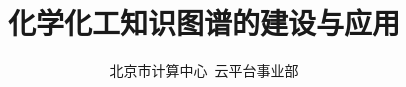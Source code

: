 
\title{化学化工知识图谱的建设与应用}
\author[ ]{北京市计算中心~云平台事业部}   %
\renewcommand*{\Authfont}{\small\rm} %
\renewcommand*{\Affilfont}{\small\it} %
\renewcommand\Authands{ and } %
\renewcommand\Authands{ , } %
\date{} %


\maketitle
